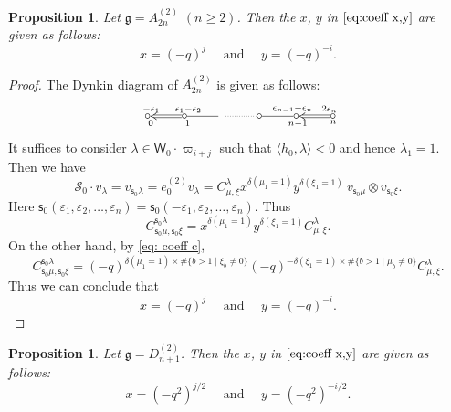 \documentclass[11pt, leqno]{amsart}
\newtheorem{proposition}[theorem]{Proposition}
\theoremstyle{definition}
\numberwithin{equation}{section}
\begin{document}
\begin{proposition} Let ${\mathfrak g}=A^{(2)}_{2n}$ $(n \ge 2)$. Then the $x$, $y$ in $\eqref{eq:coeff x,y}$ are given as follows:
$$x = (-q)^{j} \quad \text{ and } \quad y = (-q)^{-i}.$$
\end{proposition}

\begin{proof}
The Dynkin diagram of $A^{(2)}_{2n}$ is given as follows:
$$
\xymatrix@R=3ex{ *{\circ}<3pt> \ar@{<=}[r]_<{0}^{ \ -\epsilon_1
\qquad \ \  } &*{\circ}<3pt> \ar@{-}[r]_<{1}^{\epsilon_1-\epsilon_2
\qquad \ }   & {} \ar@{.}[r] & *{\circ}<3pt> \ar@{-}[r]_>{\,\,\,\
n-1}^{ \qquad \ \epsilon_{n-1}-\epsilon_{n} }
&*{\circ}<3pt>\ar@{<=}[r]_>{\,\,\,\,n}^{ \qquad \  2\epsilon_{n} }
&*{\circ}<3pt> }
$$
It suffices to consider $\lambda \in \mathsf{W}_0 \cdot {\varpi}_{i+j}$ such that
$\langle h_0, \lambda \rangle <0$ and hence $\lambda_1=1$. Then we have
$$ \mathcal{S}_0 \cdot v_\lambda=v_{{\mathsf{s}}_0 \lambda} = e_0^{(2)}v_{\lambda} = C^{\lambda}_{\mu,\xi}
x^{\delta(\mu_1=1)}y^{\delta(\xi_1=1)} \ v_{{\mathsf{s}}_0 \mu} \otimes v_{{\mathsf{s}}_0\xi}.$$
Here ${\mathsf{s}}_0(\varepsilon_1,\varepsilon_2,\ldots,\varepsilon_n)=
{\mathsf{s}}_0(-\varepsilon_1,\varepsilon_2,\ldots,\varepsilon_n)$. Thus
$$ C^{{\mathsf{s}}_0\lambda}_{{\mathsf{s}}_0\mu,{\mathsf{s}}_0\xi} = x^{\delta(\mu_1=1)}y^{\delta(\xi_1=1)} C^{\lambda}_{\mu,\xi}.$$
On the other hand, by \eqref{eq: coeff c},
$$ C^{{\mathsf{s}}_0\lambda}_{{\mathsf{s}}_0\mu,{\mathsf{s}}_0\xi}  = (-q)^{\delta(\mu_1=1) \times \# \{ b>1 \mid \xi_b \ne 0  \}
} (-q)^{-\delta(\xi_1=1) \times \# \{ b>1 \mid \mu_b \ne 0  \} }
C^{\lambda}_{\mu,\xi}.$$ Thus we can conclude that
$$x = (-q)^{j} \quad \text{ and } \quad y = (-q)^{-i}.$$
\end{proof}

\begin{proposition} \label{prop: mor D 1}
Let ${\mathfrak g}=D^{(2)}_{n+1}$. Then the $x$, $y$ in $\eqref{eq:coeff x,y}$ are given as follows:
$$x = {(-q^2)}^{j/2} \quad \text{ and } \quad y = {(-q^2)}^{-i/2}.$$
\end{proposition}
\end{document}
